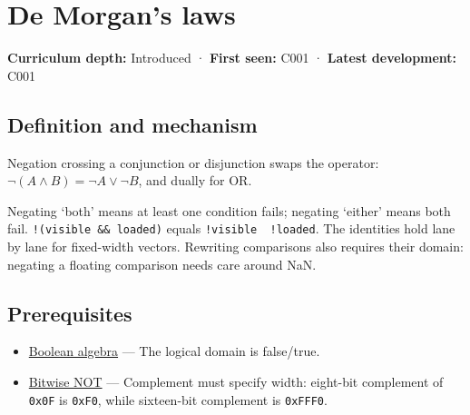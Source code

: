\hypertarget{appendix-9079d3659da4}{}\label{referencestart:appendix-9079d3659da4}
\section{De Morgan's laws}\label{appendix-9079d3659da4-de-morgans-laws}

\hypertarget{appendix-9079d3659da4-de-morgans-laws}{}

\textbf{Curriculum depth:} Introduced · \textbf{First seen:} C001 · \textbf{Latest development:} C001

\begin{allmightroledefinition}

\subsection{Definition and mechanism}\label{appendix-9079d3659da4-definition-and-mechanism}

\hypertarget{appendix-9079d3659da4-definition-and-mechanism}{}

Negation crossing a conjunction or disjunction swaps the operator: \(\neg(A\land B)=\neg A\lor\neg B\), and dually for OR.

\end{allmightroledefinition}

Negating `both' means at least one condition fails; negating `either' means both fail. \texttt{!(visible\ \&\&\ loaded)} equals \texttt{!visible\ \textbar{}\textbar{}\ !loaded}. The identities hold lane by lane for fixed-width vectors. Rewriting comparisons also requires their domain: negating a floating comparison needs care around NaN.

\subsection{Prerequisites}\label{appendix-9079d3659da4-prerequisites}

\hypertarget{appendix-9079d3659da4-prerequisites}{}

\begin{itemize}
\tightlist
\item
  \hyperref[appendix-24475e1596a8]{Boolean algebra} --- The logical domain is false/true.
\item
  \hyperref[appendix-8f38927cfc54]{Bitwise NOT} --- Complement must specify width: eight-bit complement of \texttt{0x0F} is \texttt{0xF0}, while sixteen-bit complement is \texttt{0xFFF0}.
\end{itemize}

